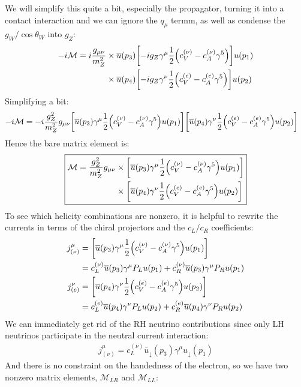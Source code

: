 \documentclass[12pt]{article}
\renewcommand{\bar}{\overline}
\newcommand{\M}{\mathcal{M}}
\numberwithin{equation}{section}
\begin{document}
We will simplify this quite a bit, especially the propagator, turning it into a contact interaction and we can ignore the $q_\mu$ termm, as well as condense the $g_W/\cos\theta_W$ into $g_Z$:
\begin{align*}
  -i\M=i\frac{g_{\mu\nu}}{m^2_Z}
  &\times\bar{u}(p_3)\qty[-ig_Z\gamma^\mu\frac12
  \qty(c_V^{(\nu)}-c_A^{(\nu)}\gamma^5)]u(p_1)\\
  &\times\bar{u}(p_4)\qty[-ig_Z\gamma^\nu\frac12
  \qty(c_V^{(e)}-c_A^{(e)}\gamma^5)]u(p_2)
\end{align*}
Simplifying a bit:
\begin{align*}
  -i\M&=-i\frac{g_Z^2}{m_Z^2}g_{\mu\nu}
  \qty[\bar{u}(p_3)\gamma^\mu\frac12\qty(c_V^{(\nu)}-c_A^{(\nu)}\gamma^5)u(p_1)]
  \qty[\bar{u}(p_4)\gamma^\nu\frac12\qty(c_V^{(e)}-c_A^{(e)}\gamma^5)u(p_2)]
\end{align*}
Hence the bare matrix element is:
\begin{equation}
  \label{eq:t51}
  \boxed{
    \begin{aligned}
      \M=\frac{g_Z^2}{m_Z^2}g_{\mu\nu}
      &\times\qty[\bar{u}(p_3)\gamma^\mu
      \frac12\qty(c_V^{(\nu)}-c_A^{(\nu)}\gamma^5)u(p_1)]\\
      &\times \qty[\bar{u}(p_4)\gamma^\nu
      \frac12\qty(c_V^{(e)}-c_A^{(e)}\gamma^5)u(p_2)]
  \end{aligned}}
\end{equation}
To see which helicity combinations are nonzero, it is helpful to rewrite the currents in terms of the chiral projectors and the $c_L/c_R$ coefficients:
\begin{align*}
  j^\mu_{(\nu)}&=\qty[\bar{u}(p_3)\gamma^\mu
  \frac12\qty(c_V^{(\nu)}-c_A^{(\nu)}\gamma^5)u(p_1)]\\
  &=c_L^{(\nu)}\bar{u}(p_3)\gamma^\mu P_L u(p_1)
  +c_R^{(\nu)}\bar{u}(p_3)\gamma^\mu P_R u(p_1)\\
  j^\nu_{(e)}&=\qty[\bar{u}(p_4)\gamma^\nu
  \frac12\qty(c_V^{(e)}-c_A^{(e)}\gamma^5)u(p_2)]\\
  &=c_L^{(e)}\bar{u}(p_4)\gamma^\nu P_L u(p_2)
  +c_R^{(e)}\bar{u}(p_4)\gamma^\nu P_R u(p_2)
\end{align*}
We can immediately get rid of the RH neutrino contributions since only LH neutrinos participate in the neutral current interaction:
\begin{align*}
  j^\mu_{(\nu)}=c_L^{(\nu)}\bar{u}_\downarrow(p_3)\gamma^\mu u_\downarrow(p_1)
\end{align*}
And there is no constraint on the handedness of the electron, so we have two nonzero matrix elements, $\M_{LR}$ and $\M_{LL}$:
\end{document}
